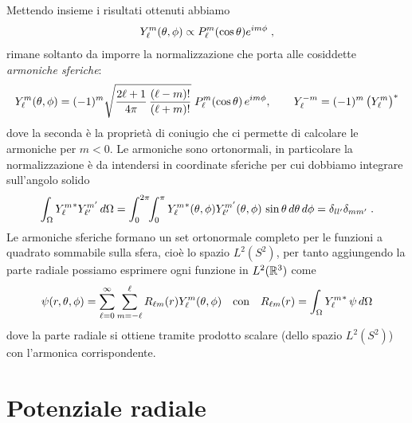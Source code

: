 Mettendo insieme i risultati ottenuti abbiamo 
\begin{align*}
  Y_\l^m(\theta , \phi) \propto P_\l^m(\cos\theta) e^{im\phi} \;,
\end{align*}
rimane soltanto da imporre la normalizzazione che porta alle cosiddette \textit{armoniche sferiche}:
\begin{align*}
  Y_\l^m(\theta,\varphi) = (-1)^m\sqrt{\frac{2\l+1}{4\pi}\,\frac{(\l-m)!}{(\l+m)!}}\;P_\l^m(\cos\theta)\,e^{im\varphi}, 
  \qquad Y_\l^{-m} = (-1)^m\,\big(Y_\l^m\big)^*
\end{align*}
dove la seconda è la proprietà di coniugio che ci permette di calcolare le armoniche per $ m < 0 $. 
Le armoniche sono ortonormali, in particolare la normalizzazione è da intendersi in coordinate sferiche per cui dobbiamo integrare sull'angolo solido
\begin{align*}
  \int_{\Omega} {Y_\l^m}^* Y_{\l'}^{m'} \, d\Omega
  = \int_0^{2\pi}\!\!\int_0^\pi {Y_\l^m}^*(\theta , \phi) Y_{\l'}^{m'}(\theta, \phi) \,\sin\theta \, d\theta\, d\phi 
  = \delta_{ll'} \delta_{mm'}\;.
\end{align*}
Le armoniche sferiche formano un set ortonormale completo per le funzioni a quadrato sommabile sulla sfera, cioè lo spazio $ L^2(S^2) $, per tanto 
aggiungendo la parte radiale possiamo esprimere ogni funzione in $ L^2(\mathbb{R}^3) $ come 
\begin{align*}
  \psi(r, \theta, \phi) = \sum_{\l = 0}^{\infty} \sum_{m = -\l}^\l R_{\l m}(r) Y_\l^m(\theta, \phi) 
  \quad \text{con} \quad R_{\l m}(r) = \int_\Omega {Y_\l^m}^* \, \psi \,d\Omega
\end{align*}
dove la parte radiale si ottiene tramite prodotto scalare (dello spazio $ L^2(S^2) $) con l'armonica corrispondente.

\chapter{Potenziale radiale}


